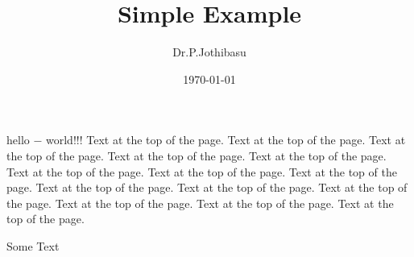 \documentclass{article}
\title{Simple Example}
\author{Dr.P.Jothibasu}
\date{\today}
\begin{document}
\maketitle
hello $-$ world!!!
\hspace{1cm}
Text at the top of the page. Text at the top of the page. 
Text at the top of the page. Text at the top of the page. 
Text at the top of the page. Text at the top of the page. 
Text at the top of the page.
\vspace{5cm}
Text at the top of the page. Text at the top of the page. 
Text at the top of the page. Text at the top of the page. 
Text at the top of the page. Text at the top of the page. 
Text at the top of the page.

\vfill
\hfill
Some Text
\end{document}
